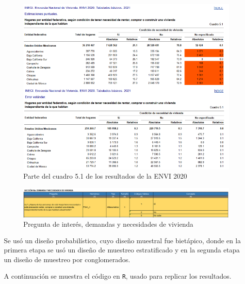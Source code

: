 \documentclass[
]{article}
\newenvironment{Shaded}{\begin{snugshade}}{\end{snugshade}}
\newcommand{\CommentTok}[1]{\textcolor[rgb]{0.56,0.35,0.01}{\textit{#1}}}
\newcommand{\DecValTok}[1]{\textcolor[rgb]{0.00,0.00,0.81}{#1}}
\newcommand{\KeywordTok}[1]{\textcolor[rgb]{0.13,0.29,0.53}{\textbf{#1}}}
\newcommand{\NormalTok}[1]{#1}
\newcommand{\OperatorTok}[1]{\textcolor[rgb]{0.81,0.36,0.00}{\textbf{#1}}}
\newcommand{\StringTok}[1]{\textcolor[rgb]{0.31,0.60,0.02}{#1}}
\begin{document}
\begin{figure}[H]
\centering
    \includegraphics[width=160mm]{images/ENVI2020.png}
    \caption{Parte del cuadro 5.1 de los resultados de la ENVI 2020}
    \label{Envi2020}
\end{figure}

\begin{figure}[H]
\centering
    \includegraphics[width=160mm]{images/enc.png}
    \caption{Pregunta de interés, demandas y necesidades de vivienda}
    \label{Pregunta de interés}
\end{figure}

Se usó un diseño probabilístico, cuyo diseño muestral fue bietápico,
donde en la primera etapa se usó un diseño de muestreo estratificado y
en la segunda etapa un diseño de muestreo por conglomerados.

A continuación se muestra el código en \texttt{R}, usado para replicar los resultados.

\begin{Shaded}
\end{Shaded}
\end{document}
